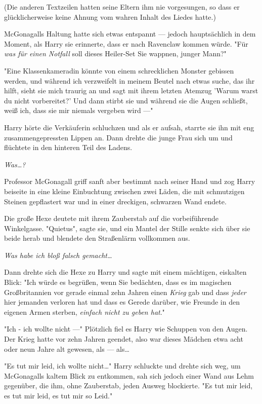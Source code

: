 {(Die anderen Textzeilen hatten seine Eltern ihm nie vorgesungen, so dass er glücklicherweise keine Ahnung vom wahren Inhalt des Liedes hatte.)

McGonagalls Haltung hatte sich etwas entspannt --- jedoch hauptsächlich in dem Moment, als Harry sie erinnerte, dass er nach Ravenclaw kommen würde. "Für \emph{was für einen Notfall} soll dieses Heiler-Set Sie wappnen, junger Mann?"

"Eine Klassenkameradin könnte von einem schrecklichen Monster gebissen werden, und während ich verzweifelt in meinem Beutel nach etwas suche, das ihr hilft, sieht sie mich traurig an und sagt mit ihrem letzten Atemzug 'Warum warst du nicht vorbereitet?' Und dann stirbt sie und während sie die Augen schließt, weiß ich, dass sie mir niemals vergeben wird ---"

Harry hörte die Verkäuferin schluchzen und als er aufsah, starrte sie ihn mit eng zusammengepressten Lippen an. Dann drehte die junge Frau sich um und flüchtete in den hinteren Teil des Ladens.

\emph{Was…?}

Professor McGonagall griff sanft aber bestimmt nach seiner Hand und zog Harry beiseite in eine kleine Einbuchtung zwischen zwei Läden, die mit schmutzigen Steinen gepflastert war und in einer dreckigen, schwarzen Wand endete.

Die große Hexe deutete mit ihrem Zauberstab auf die vorbeiführende Winkelgasse. "Quietus", sagte sie, und ein Mantel der Stille senkte sich über sie beide herab und blendete den Straßenlärm vollkommen aus.

\emph{Was habe ich bloß falsch gemacht…}

Dann drehte sich die Hexe zu Harry und sagte mit einem mächtigen, eiskalten Blick: "Ich würde es begrüßen, wenn Sie bedächten, dass es im magischen Großbritannien vor gerade einmal zehn Jahren einen \emph{Krieg} gab und dass \emph{jeder} hier jemanden verloren hat und dass es Gerede darüber, wie Freunde in den eigenen Armen sterben, \emph{einfach nicht zu geben hat}."

"Ich - ich wollte nicht ---" Plötzlich fiel es Harry wie Schuppen von den Augen. Der Krieg hatte vor zehn Jahren geendet, also war dieses Mädchen etwa acht oder neun Jahre alt gewesen, als --- als…

"Es tut mir leid, ich wollte nicht…" Harry schluckte und drehte sich weg, um McGonagalls kaltem Blick zu entkommen, sah sich jedoch einer Wand aus Lehm gegenüber, die ihm, ohne Zauberstab, jeden Ausweg blockierte. "Es tut mir leid, es tut mir leid, es tut mir so Leid."

}
